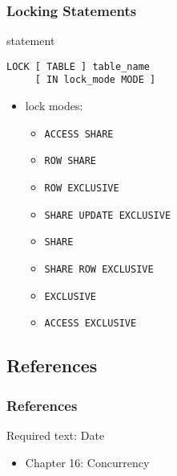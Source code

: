 \documentclass[dvipsnames]{beamer}
\theoremstyle{plain}
\begin{document}
\begin{frame}[fragile]
  \frametitle{Locking Statements}

  \begin{block}{statement}
    \begin{lstlisting}
LOCK [ TABLE ] table_name
     [ IN lock_mode MODE ]
    \end{lstlisting}

    \pause
    \begin{itemize}
      \item lock modes:
      \begin{itemize}
        \item \lstinline!ACCESS SHARE!
        \item \lstinline!ROW SHARE!
        \item \lstinline!ROW EXCLUSIVE!
        \item \lstinline!SHARE UPDATE EXCLUSIVE!
        \item \lstinline!SHARE!
        \item \lstinline!SHARE ROW EXCLUSIVE!
        \item \lstinline!EXCLUSIVE!
        \item \lstinline!ACCESS EXCLUSIVE!
      \end{itemize}
    \end{itemize}

  \end{block}
\end{frame}

\subsection*{References}

\begin{frame}
  \frametitle{References}

  \begin{block}{Required text: Date}
    \begin{itemize}
      \item Chapter 16: \alert{Concurrency}
    \end{itemize}
  \end{block}
\end{frame}
\end{document}
